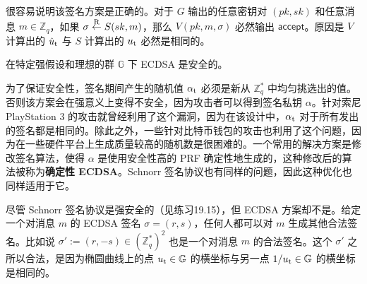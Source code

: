 很容易说明该签名方案是正确的。对于 $G$ 输出的任意密钥对 $(pk,sk)$ 和任意消息 $m\in\mathbb{Z}_q$，如果 $\sigma\overset{\rm R}\leftarrow S(sk,m)$，那么 $V(pk,m,\sigma)$ 必然输出 $\mathsf{accept}$。原因是 $V$ 计算出的 $\hat u_{\rm t}$ 与 $S$ 计算出的 $u_{\rm t}$ 必然是相同的。

在特定强假设和理想的群 $\mathbb{G}$ 下 ECDSA 是安全的。

为了保证安全性，签名期间产生的随机值 $\alpha_{\rm t}$ 必须是新从 $\mathbb{Z}_q^*$ 中均匀挑选出的值。否则该方案会在强意义上变得不安全，因为攻击者可以得到签名私钥 $\alpha$。针对索尼 PlayStation 3 的攻击就曾经利用了这个漏洞，因为在该设计中，$\alpha_{\rm t}$ 对于所有发出的签名都是相同的。除此之外，一些针对比特币钱包的攻击也利用了这个问题，因为在一些硬件平台上生成质量较高的随机数是很困难的。一个常用的解决方案是修改签名算法，使得 $\alpha$ 是使用安全性高的 PRF 确定性地生成的，这种修改后的算法被称为\textbf{确定性 ECDSA}。Schnorr 签名协议也有同样的问题，因此这种优化也同样适用于它。

\begin{snote}[ECDSA不是强安全的.]
尽管 Schnorr 签名协议是强安全的（见练习19.15），但 ECDSA 方案却不是。给定一个对消息 $m$ 的 ECDSA 签名 $\sigma=(r,s)$，任何人都可以对 $m$ 生成其他合法签名。比如说 $\sigma':=(r,-s)\in(\mathbb{Z}_q^*)^2$ 也是一个对消息 $m$ 的合法签名。这个 $\sigma'$ 之所以合法，是因为椭圆曲线上的点 $u_{\rm t}\in\mathbb{G}$ 的横坐标与另一点 ${1}/{u_{\rm t}}\in\mathbb{G}$ 的横坐标是相同的。
\end{snote}